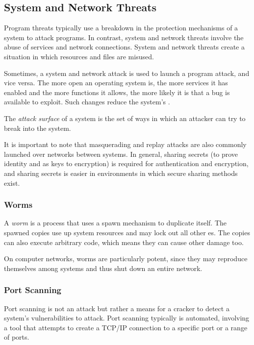 \subsection{System and Network Threats}\label{subsec:System_Network_Threats}
Program threats typically use a breakdown in the protection mechanisms of a system to attack programs.
In contrast, system and network threats involve the abuse of services and network connections.
System and network threats create a situation in which  resources and  files are misused.

Sometimes, a system and network attack is used to launch a program attack, and vice versa.
The more open an operating system is, the more services it has enabled and the more functions it allows, the more likely it is that a bug is available to exploit.
Such changes reduce the system’s .

\begin{definition}\label{def:Attack_Surface}
  The \emph{attack surface} of a system is the set of ways in which an attacker can try to break into the system.
\end{definition}

It is important to note that masquerading and replay attacks are also commonly launched over networks between systems.
In general, sharing secrets (to prove identity and as keys to encryption) is required for authentication and encryption, and sharing secrets is easier in environments in which secure sharing methods exist.

\subsubsection{Worms}\label{subsubsec:Worms}
\begin{definition}[Worm]\label{def:Worm}
  A \emph{worm} is a process that uses a spawn mechanism to duplicate itself.
  The spawned copies use up system resources and may lock out all other es.
  The copies can also execute arbitrary code, which means they can cause other damage too.
\end{definition}

On computer networks, worms are particularly potent, since they may reproduce themselves among systems and thus shut down an entire network.

\subsubsection{Port Scanning}\label{subsubsec:Port_Scanning}
Port scanning is not an attack but rather a means for a cracker to detect a system’s vulnerabilities to attack.
Port scanning typically is automated, involving a tool that attempts to create a TCP/IP connection to a specific port or a range of ports.

